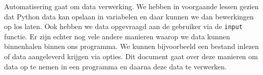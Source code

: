 Automatisering gaat om data verwerking. We hebben in voorgaande lessen gezien dat Python data kan opslaan in variabelen en daar kunnen we dan bewerkingen op los laten. Ook hebben we data opgevraagd aan de gebruiker via de \texttt{input} functie. Er zijn echter nog vele andere manieren waarop we data kunnen binnenhalen binnen ons programma. We kunnen bijvoorbeeld een bestand inlezen of data aangeleverd krijgen via opties. Dit document gaat over deze manieren om data op te nemen in een programma en daarna deze data te verwerken.

